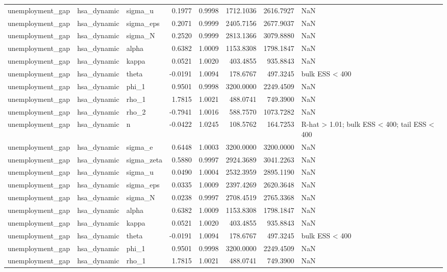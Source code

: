 \begin{tabular}{lllrrrrl}
unemployment\_gap & hsa\_dynamic & sigma\_u & 0.1977 & 0.9998 & 1712.1036 & 2616.7927 & NaN \\
unemployment\_gap & hsa\_dynamic & sigma\_eps & 0.2071 & 0.9999 & 2405.7156 & 2677.9037 & NaN \\
unemployment\_gap & hsa\_dynamic & sigma\_N & 0.2520 & 0.9999 & 2813.1366 & 3079.8880 & NaN \\
unemployment\_gap & hsa\_dynamic & alpha & 0.6382 & 1.0009 & 1153.8308 & 1798.1847 & NaN \\
unemployment\_gap & hsa\_dynamic & kappa & 0.0521 & 1.0020 & 403.4855 & 935.8843 & NaN \\
unemployment\_gap & hsa\_dynamic & theta & -0.0191 & 1.0094 & 178.6767 & 497.3245 & bulk ESS < 400 \\
unemployment\_gap & hsa\_dynamic & phi\_1 & 0.9501 & 0.9998 & 3200.0000 & 2249.4509 & NaN \\
unemployment\_gap & hsa\_dynamic & rho\_1 & 1.7815 & 1.0021 & 488.0741 & 749.3900 & NaN \\
unemployment\_gap & hsa\_dynamic & rho\_2 & -0.7941 & 1.0016 & 588.7570 & 1073.7282 & NaN \\
unemployment\_gap & hsa\_dynamic & n & -0.0422 & 1.0245 & 108.5762 & 164.7253 & R-hat > 1.01; bulk ESS < 400; tail ESS < 400 \\
unemployment\_gap & hsa\_dynamic & sigma\_e & 0.6448 & 1.0003 & 3200.0000 & 3200.0000 & NaN \\
unemployment\_gap & hsa\_dynamic & sigma\_zeta & 0.5880 & 0.9997 & 2924.3689 & 3041.2263 & NaN \\
unemployment\_gap & hsa\_dynamic & sigma\_u & 0.0490 & 1.0004 & 2532.3959 & 2895.1190 & NaN \\
unemployment\_gap & hsa\_dynamic & sigma\_eps & 0.0335 & 1.0009 & 2397.4269 & 2620.3648 & NaN \\
unemployment\_gap & hsa\_dynamic & sigma\_N & 0.0238 & 0.9997 & 2708.4519 & 2765.3368 & NaN \\
unemployment\_gap & hsa\_dynamic & alpha & 0.6382 & 1.0009 & 1153.8308 & 1798.1847 & NaN \\
unemployment\_gap & hsa\_dynamic & kappa & 0.0521 & 1.0020 & 403.4855 & 935.8843 & NaN \\
unemployment\_gap & hsa\_dynamic & theta & -0.0191 & 1.0094 & 178.6767 & 497.3245 & bulk ESS < 400 \\
unemployment\_gap & hsa\_dynamic & phi\_1 & 0.9501 & 0.9998 & 3200.0000 & 2249.4509 & NaN \\
unemployment\_gap & hsa\_dynamic & rho\_1 & 1.7815 & 1.0021 & 488.0741 & 749.3900 & NaN \\

\end{tabular}
